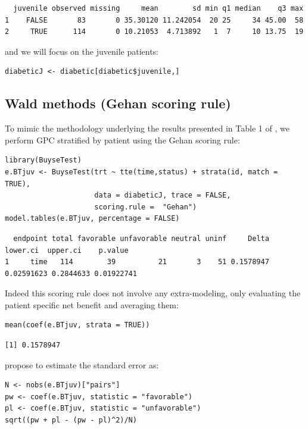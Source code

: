 \documentclass[12pt]{article}
\begin{document}
\begin{verbatim}
  juvenile observed missing     mean        sd min q1 median    q3 max
1    FALSE       83       0 35.30120 11.242054  20 25     34 45.00  58
2     TRUE      114       0 10.21053  4.713892   1  7     10 13.75  19
\end{verbatim}


and we will focus on the juvenile patients:
\lstset{language=r,label= ,caption= ,captionpos=b,numbers=none}
\begin{lstlisting}
diabeticJ <- diabetic[diabetic$juvenile,]
\end{lstlisting}

\subsection{Wald methods (Gehan scoring rule)}
\label{sec:orgc6c1268}

To mimic the methodology underlying the results presented in Table 1
of \cite{matsouaka2022robust}, we perform GPC stratified by patient
using the Gehan scoring rule:
\lstset{language=r,label= ,caption= ,captionpos=b,numbers=none}
\begin{lstlisting}
library(BuyseTest)
e.BTjuv <- BuyseTest(trt ~ tte(time,status) + strata(id, match = TRUE), 
                     data = diabeticJ, trace = FALSE,
                     scoring.rule =  "Gehan")
model.tables(e.BTjuv, percentage = FALSE)
\end{lstlisting}

\begin{verbatim}
  endpoint total favorable unfavorable neutral uninf     Delta   lower.ci  upper.ci    p.value
1     time   114        39          21       3    51 0.1578947 0.02591623 0.2844633 0.01922741
\end{verbatim}


Indeed this scoring rule does not involve any extra-modeling, only
evaluating the patient specific net benefit and averaging them:
\lstset{language=r,label= ,caption= ,captionpos=b,numbers=none}
\begin{lstlisting}
mean(coef(e.BTjuv, strata = TRUE))
\end{lstlisting}

\begin{verbatim}
[1] 0.1578947
\end{verbatim}


\cite{matsouaka2022robust} propose to estimate the standard error as:
\lstset{language=r,label= ,caption= ,captionpos=b,numbers=none}
\begin{lstlisting}
N <- nobs(e.BTjuv)["pairs"]
pw <- coef(e.BTjuv, statistic = "favorable")
pl <- coef(e.BTjuv, statistic = "unfavorable")
sqrt((pw + pl - (pw - pl)^2)/N)
\end{lstlisting}
\end{document}
